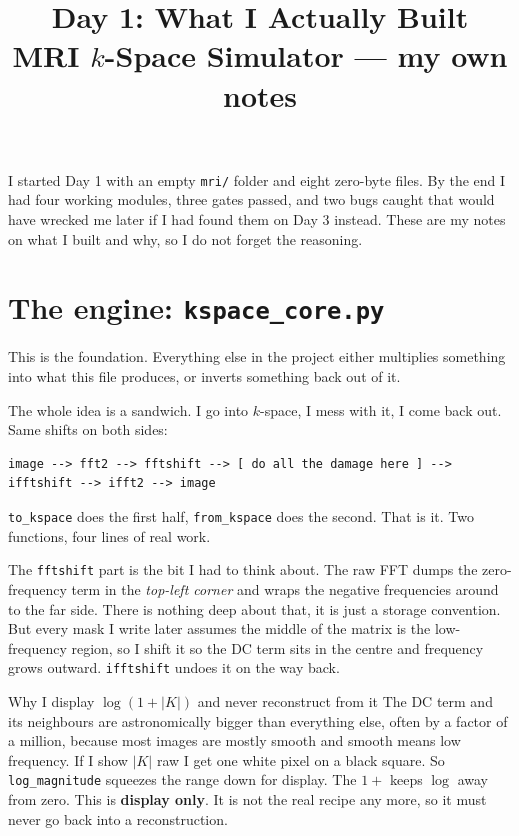 \documentclass[11pt,a4paper]{article}
\title{\textbf{Day 1: What I Actually Built}\\[4pt]
\large MRI $k$-Space Simulator --- my own notes}
\author{}
\date{}
\begin{document}
\maketitle
\vspace{-2.2cm}

\section*{}

I started Day 1 with an empty \texttt{mri/} folder and eight zero-byte files. By
the end I had four working modules, three gates passed, and two bugs caught that
would have wrecked me later if I had found them on Day 3 instead. These are my
notes on what I built and why, so I do not forget the reasoning.

\section{The engine: \texttt{kspace\_core.py}}

This is the foundation. Everything else in the project either multiplies
something into what this file produces, or inverts something back out of it.

The whole idea is a sandwich. I go into $k$-space, I mess with it, I come back
out. Same shifts on both sides:

\begin{lstlisting}
image --> fft2 --> fftshift --> [ do all the damage here ] --> ifftshift --> ifft2 --> image
\end{lstlisting}

\texttt{to\_kspace} does the first half, \texttt{from\_kspace} does the second.
That is it. Two functions, four lines of real work.

The \texttt{fftshift} part is the bit I had to think about. The raw FFT dumps the
zero-frequency term in the \emph{top-left corner} and wraps the negative
frequencies around to the far side. There is nothing deep about that, it is just
a storage convention. But every mask I write later assumes the middle of the
matrix is the low-frequency region, so I shift it so the DC term sits in the
centre and frequency grows outward. \texttt{ifftshift} undoes it on the way back.

\begin{notebox}{Why I display $\log(1+|K|)$ and never reconstruct from it}
The DC term and its neighbours are astronomically bigger than everything else,
often by a factor of a million, because most images are mostly smooth and smooth
means low frequency. If I show $|K|$ raw I get one white pixel on a black square.
So \texttt{log\_magnitude} squeezes the range down for display. The $1+$ keeps
$\log$ away from zero. This is \textbf{display only}. It is not the real recipe
any more, so it must never go back into a reconstruction.
\end{notebox}
\end{document}
